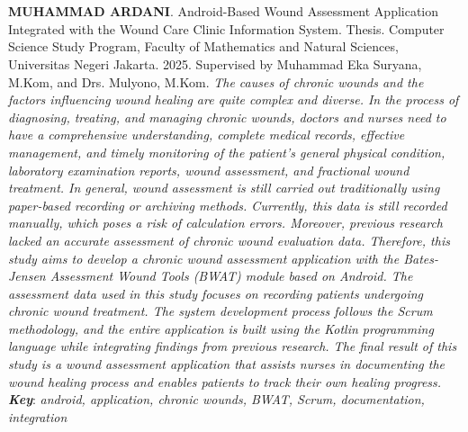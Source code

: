 \chapter*{}

\begin{spacing}{1}
\textbf{MUHAMMAD ARDANI}. Android-Based Wound Assessment Application Integrated with the Wound Care Clinic Information System. Thesis. Computer Science Study Program, Faculty of Mathematics and Natural Sciences, Universitas Negeri Jakarta. 2025. Supervised by Muhammad Eka Suryana, M.Kom, and Drs. Mulyono, M.Kom.
\newline
\newline
\textit{The causes of chronic wounds and the factors influencing wound healing are quite complex and diverse. In the process of diagnosing, treating, and managing chronic wounds, doctors and nurses need to have a comprehensive understanding, complete medical records, effective management, and timely monitoring of the patient's general physical condition, laboratory examination reports, wound assessment, and fractional wound treatment. In general, wound assessment is still carried out traditionally using paper-based recording or archiving methods. Currently, this data is still recorded manually, which poses a risk of calculation errors. Moreover, previous research lacked an accurate assessment of chronic wound evaluation data. Therefore, this study aims to develop a chronic wound assessment application with the Bates-Jensen Assessment Wound Tools (BWAT) module based on Android. The assessment data used in this study focuses on recording patients undergoing chronic wound treatment. The system development process follows the Scrum methodology, and the entire application is built using the Kotlin programming language while integrating findings from previous research. The final result of this study is a wound assessment application that assists nurses in documenting the wound healing process and enables patients to track their own healing progress.}
\newline
\newline
\noindent \textbf{\textit{Key}}: \textit{android, application, chronic wounds, BWAT, Scrum, documentation, integration}
\end{spacing}